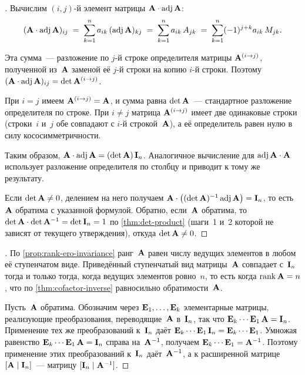 \begin{proof}[]
Вычислим $(i, j)$-й элемент матрицы $\mathbf{A} \cdot \operatorname{adj} \mathbf{A}$:
\[
  (\mathbf{A} \cdot \operatorname{adj} \mathbf{A})_{ij}
  \;=\; \sum_{k=1}^{n} a_{ik}\,(\operatorname{adj} \mathbf{A})_{kj}
  \;=\; \sum_{k=1}^{n} a_{ik}\,A_{jk}
  \;=\; \sum_{k=1}^{n} (-1)^{j+k} a_{ik}\,M_{jk}.
\]

Эта сумма~--- разложение по $j$-й строке определителя матрицы
$\mathbf{A}^{(i \to j)}$, полученной из~$\mathbf{A}$ заменой её $j$-й строки
на копию $i$-й строки. Поэтому
$(\mathbf{A} \cdot \operatorname{adj} \mathbf{A})_{ij} = \det \mathbf{A}^{(i \to j)}$.

При $i = j$ имеем $\mathbf{A}^{(i \to j)} = \mathbf{A}$, и сумма равна
$\det \mathbf{A}$~--- стандартное разложение определителя по строке.
При $i \neq j$ матрица $\mathbf{A}^{(i \to j)}$ имеет две одинаковые
строки (строки~$i$ и~$j$ обе совпадают с $i$-й строкой~$\mathbf{A}$), а
её определитель равен нулю в силу кососимметричности.

Таким образом, $\mathbf{A} \cdot \operatorname{adj} \mathbf{A} = (\det \mathbf{A})\,\mathbf{I}_n$.
Аналогичное вычисление для $\operatorname{adj} \mathbf{A} \cdot \mathbf{A}$ использует
разложение определителя по столбцу и приводит к тому же результату.

Если $\det \mathbf{A} \neq 0$, делением на него получаем
$\mathbf{A} \cdot \bigl((\det \mathbf{A})^{-1} \operatorname{adj} \mathbf{A}\bigr) = \mathbf{I}_n$,
то есть~$\mathbf{A}$ обратима с указанной формулой. Обратно, если~$\mathbf{A}$
обратима, то $\det \mathbf{A} \cdot \det \mathbf{A}^{-1} = \det \mathbf{I}_n = 1$
по \cref{thm:det-product} (шаги~1 и~2 которой не зависят от текущего
утверждения), откуда $\det \mathbf{A} \neq 0$.
\end{proof}

\begin{proof}[]
По \cref{prop:rank-ero-invariance} ранг~$\mathbf{A}$ равен числу ведущих
элементов в любом её ступенчатом виде. Приведённый ступенчатый вид
матрицы~$\mathbf{A}$ совпадает с~$\mathbf{I}_n$ тогда и только тогда, когда
ведущих элементов ровно~$n$, то есть когда $\operatorname{rank} \mathbf{A} = n$, что по
\cref{thm:cofactor-inverse} равносильно обратимости~$\mathbf{A}$.

Пусть~$\mathbf{A}$ обратима. Обозначим через
$\mathbf{E}_1, \dots, \mathbf{E}_k$ элементарные матрицы, реализующие
преобразования, переводящие~$\mathbf{A}$ в~$\mathbf{I}_n$, так что
$\mathbf{E}_k \cdots \mathbf{E}_1\,\mathbf{A} = \mathbf{I}_n$. Применение тех же
преобразований к~$\mathbf{I}_n$ даёт
$\mathbf{E}_k \cdots \mathbf{E}_1\,\mathbf{I}_n = \mathbf{E}_k \cdots \mathbf{E}_1$.
Умножая равенство $\mathbf{E}_k \cdots \mathbf{E}_1\,\mathbf{A} = \mathbf{I}_n$
справа на~$\mathbf{A}^{-1}$, получаем
$\mathbf{E}_k \cdots \mathbf{E}_1 = \mathbf{A}^{-1}$. Поэтому применение этих
преобразований к~$\mathbf{I}_n$ даёт~$\mathbf{A}^{-1}$, а к расширенной
матрице $[\mathbf{A} \mid \mathbf{I}_n]$~--- матрицу
$[\mathbf{I}_n \mid \mathbf{A}^{-1}]$.
\end{proof}

